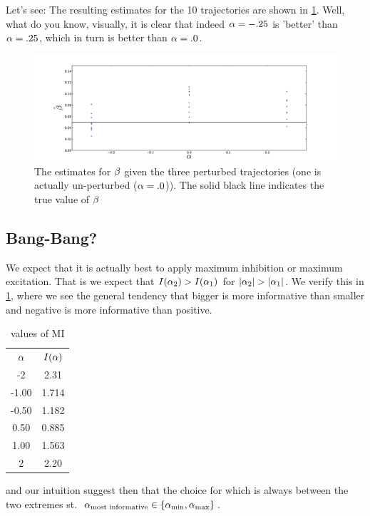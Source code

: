 \documentclass{article}
\begin{document}
Let's see: The resulting estimates for the 10 trajectories are shown in
\cref{fig:perturbed_estimates}. Well, what do you know, visually, it is clear
that indeed ${\alpha}=-.25$ is  'better' than ${\alpha}=.25$, which in turn is better than ${\alpha}=.0$.
\begin{figure}
\begin{center}
\includegraphics[width=1\textwidth]{Figs/MIML/perturbed_estimates.pdf}
\caption[]{The estimates for ${\beta}$ given the three perturbed
trajectories (one is actually un-perturbed (${\alpha}=.0$)). The solid black line
indicates the true value of ${\beta}$}
\label{fig:perturbed_estimates}
\end{center}
\end{figure}

\subsection{Bang-Bang?}
We expect that it is actually best to apply maximum inhibition or maximum
excitation. That is we expect that $I({\alpha}_2) > I({\alpha}_1)$ for $|{\alpha}_2| > |{\alpha}_1|$. We
verify this in \cref{tab:MI_bang_bang_alphas}, where we see the general tendency
that bigger is more informative than smaller and negative is more informative
than positive.
\begin{table}
\begin{centering}
\begin{tabular}{cc}
${\alpha}$& $I({\alpha})$ \\
-2&  2.31 \\
-1.00 & 1.714 \\
-0.50 & 1.182 \\
0.50 & 0.885 \\
1.00 & 1.563 \\
2 &  2.20 \\
\end{tabular}
\caption{values of MI}
\label{tab:MI_bang_bang_alphas}
\end{centering}
\end{table}
 and our intuition suggest then that the choice
for which is always between the two extremes st.\ ${\alpha}_{\textrm{most
informative}} \in \{{ {\alpha}_{\textrm{min}} }, { {\alpha}_{\textrm{max}} }\}$.
\end{document}
